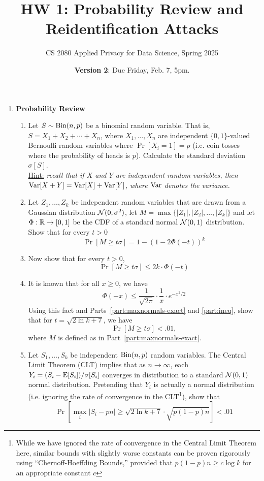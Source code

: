 \documentclass[11pt]{article}
\title{\vspace{-1.5cm} HW 1:  Probability Review and Reidentification Attacks}
\author{CS 2080 Applied Privacy for Data Science, Spring 2025}
\date{\textbf{Version 2}: Due Friday, Feb. 7, 5pm.}
\begin{document}
\maketitle

\vspace{-3ex}

\instructions

\begin{enumerate}[leftmargin=*]

\item \textbf{Probability Review}

\begin{enumerate}
    \item  Let $S\sim \mathrm{Bin}(n,p)$ be a binomial random variable.  That is, $S=X_1+X_2+\cdots+X_n$, where 
    $X_1,\ldots,X_n$ are independent $\{0,1\}$-valued Bernoulli random variables where $\Pr[X_i = 1]=p$ (i.e. coin tosses where the probability of heads is $p$).  Calculate the standard deviation $\sigma[S]$. \\
    
    \underline{Hint:} \textit{recall that if $X$ and $Y$ are independent random variables, then $\mathrm{Var}[X+Y]=\mathrm{Var}[X]+\mathrm{Var}[Y]$, where $\mathrm{Var}$ denotes the variance.} \\

    \item Let $Z_1,\ldots,Z_k$ be independent random variables that are drawn from a Gaussian distribution $\mathcal{N}(0, \sigma^2)$, let $M=\max\{|Z_1|,|Z_2|,\ldots,|Z_k|\}$ and let $\Phi : \mathbb{R}\rightarrow [0,1]$ be the CDF of a standard normal $\mathcal{N}(0,1)$ distribution.  Show that for every $t>0$
    $$\Pr[M \geq t\sigma ] = 1- (1 - 2\Phi(-t))^k$$

    \label{part:maxnormals-exact}

    \item Now show that for every $t > 0$, $$\Pr[M \geq t\sigma ] \leq 2k\cdot \Phi(-t)$$
    \label{part:ineq}
    
    \item It is known that for all $x\geq 0$, we have 
    $$\Phi(-x) \leq \frac{1}{\sqrt{2\pi}}\cdot \frac{1}{x}\cdot e^{-x^2/2}$$
    Using this fact and Parts~\ref{part:maxnormals-exact} and \ref{part:ineq}, show that for $t = \sqrt{2\ln k+7}$, we have
    $$\Pr[M \geq t\sigma] < .01,$$
    where $M$ is defined as in Part~\ref{part:maxnormals-exact}.

    
    \item Let $S_1,\ldots,S_k$ be independent $\mathrm{Bin}(n,p)$ random variables.  The Central Limit Theorem (CLT) implies that as $n\rightarrow \infty$, each $Y_i=(S_i-\mathrm{E}[S_i])/\sigma[S_i]$ converges in distribution to a standard $\mathcal{N}(0,1)$ normal distribution. Pretending that $Y_i$ is actually a normal distribution (i.e. ignoring the rate of convergence in the CLT\footnote{While we have ignored the rate of convergence in the Central Limit Theorem here, similar bounds with slightly worse constants can be proven rigorously using ``Chernoff-Hoeffding Bounds,'' provided that $p(1-p)n\geq c\log k$ for an appropriate constant $c$}), show that
    $$\Pr\left[\max_i |S_i-pn| \geq \sqrt{2\ln k + 7} \cdot\sqrt{p(1-p) n}\right] < .01$$
      

\end{enumerate}
\end{enumerate}
\end{document}
